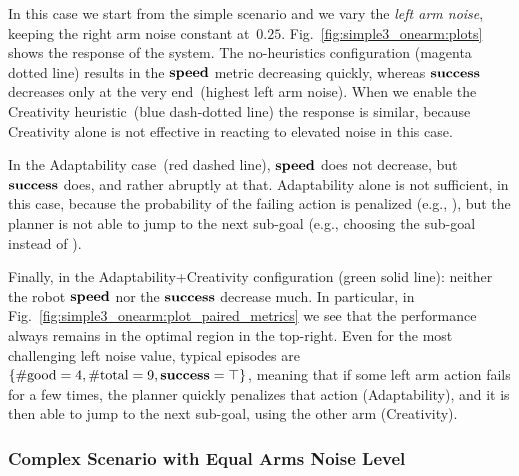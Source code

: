 In this case we start from the simple scenario and we vary the \emph{left arm noise}, keeping the right arm noise constant at~$0.25$.
Fig.~\ref{fig:simple3_onearm:plots} shows the response of the system.
The no-heuristics configuration (magenta dotted line) results in the $\textbf{\ensuremath{\text{speed}}}$ metric decreasing quickly, whereas $\textbf{\ensuremath{\text{success}}}$ decreases only at the very end~(highest left arm noise).
When we enable the Creativity heuristic~(blue dash-dotted line) the response is similar, because Creativity alone is not effective in reacting to elevated noise in this case.

In the Adaptability case~(red dashed line), $\textbf{\ensuremath{\text{speed}}}$ does not decrease, but $\textbf{\ensuremath{\text{success}}}$ does, and rather abruptly at that. Adaptability alone is not sufficient, in this case, because the probability of the failing action is penalized (e.g., ), but the planner is not able to jump to the next sub-goal (e.g., choosing the sub-goal  instead of ).

Finally, in the Adaptability+Creativity configuration (green solid line): neither the robot $\textbf{\ensuremath{\text{speed}}}$ nor the $\textbf{\ensuremath{\text{success}}}$ decrease much.
In particular, in Fig.~\ref{fig:simple3_onearm:plot_paired_metrics} we see that the performance always remains in the optimal region in the top-right.
Even for the most challenging left noise value, typical episodes are $\{ \text{\#good}=4, \text{\#total}=9, \textbf{\ensuremath{\text{success}}}=\top \}$, meaning that if some left arm action fails for a few times, the planner quickly penalizes that action (Adaptability), and it is then able to jump to the next sub-goal, using the other arm (Creativity).

\subsubsection{Complex Scenario with Equal Arms Noise Level}
\label{sec:poeticon++:results:quantitative:complex}

